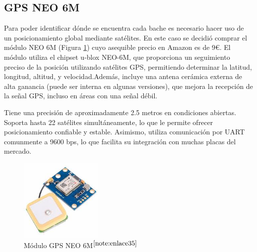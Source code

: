 \setcounter{footnote}{34} %

\subsection{GPS NEO 6M}

Para poder identificar dónde se encuentra cada bache es necesario hacer uso de un posicionamiento global mediante satélites. En este caso se decidió comprar el módulo NEO 6M (Figura \ref{fig:gps}) cuyo asequible precio en Amazon es de 9€. El módulo utiliza el chipset u-blox NEO-6M, que proporciona un seguimiento preciso de la posición utilizando satélites \acs{GPS}, permitiendo determinar la latitud, longitud, altitud, y velocidad.Además, incluye una antena cerámica externa de alta ganancia (puede ser interna en algunas versiones), que mejora la recepción de la señal \acs{GPS}, incluso en áreas con una señal débil.

Tiene una precisión de aproximadamente 2.5 metros en condiciones abiertas. Soporta hasta 22 satélites simultáneamente, lo que le permite ofrecer posicionamiento confiable y estable. Asimismo, utiliza comunicación por \ac{UART} comunmente a 9600 bps, lo que facilita su integración con muchas placas del mercado.

\begin{figure} [h!]
	\begin{center}
		\includegraphics[width=4cm]{figs/GPSNEO6MV2.jpeg}
	\end{center}
	\caption{Módulo GPS NEO 6M$^{\ref{note:enlace35}}$} 
\label{fig:gps}
\end{figure}\

\setcounter{footnote}{35} %


